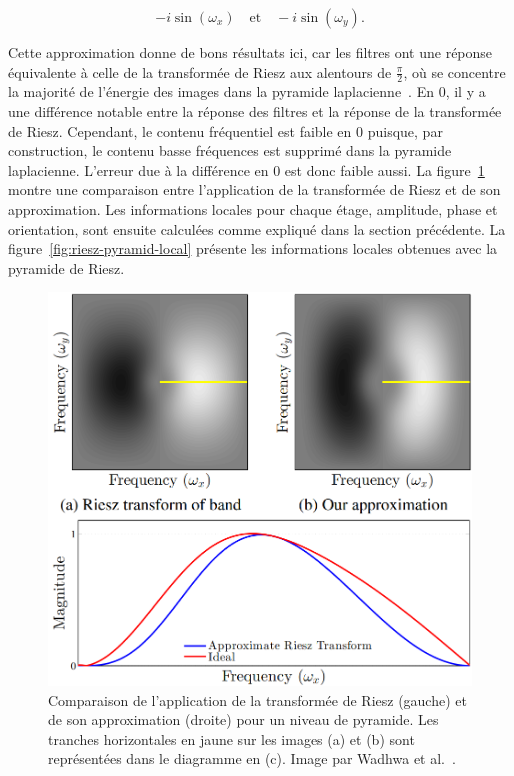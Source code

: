 \begin{equation}
    -i\sin(\omega_x) \quad \text{et} \quad -i\sin(\omega_y).
\end{equation}

Cette approximation donne de bons résultats ici, car les filtres ont une réponse équivalente à celle de la transformée de Riesz aux alentours de $\frac\pi2$, où se concentre la majorité de l'énergie des images dans la pyramide laplacienne~\cite{wadhwa_riesz_2014}. En $0$, il y a une différence notable entre la réponse des filtres et la réponse de la transformée de Riesz. Cependant, le contenu fréquentiel est faible en $0$ puisque, par construction, le contenu basse fréquences est supprimé dans la pyramide laplacienne. L'erreur due à la différence en $0$ est donc faible aussi. La figure~\ref{fig:riesz-approximation} montre une comparaison entre l'application de la transformée de Riesz et de son approximation. Les informations locales pour chaque étage, amplitude, phase et orientation, sont ensuite calculées comme expliqué dans la section précédente. La figure~\ref{fig:riesz-pyramid-local} présente les informations locales obtenues avec la pyramide de Riesz.

\bigskip

\begin{figure}[h]
    \centering
    \includegraphics[width=.65\textwidth]{contenu/resources/images/riesz_approximation}
    \caption[Approximation de la transformée de Riesz]{Comparaison de l'application de la transformée de Riesz (gauche) et de son approximation (droite) pour un niveau de pyramide. Les tranches horizontales en jaune sur les images (a) et (b) sont représentées dans le diagramme en (c). Image par Wadhwa et al.~\cite{wadhwa_riesz_2014}.}
    \label{fig:riesz-approximation}
\end{figure}

